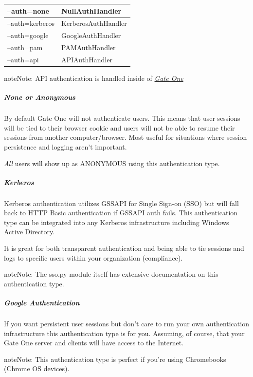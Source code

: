 \documentclass[letterpaper,10pt,openany]{sphinxmanual}
\begin{document}
\begin{tabulary}{\linewidth}{|L|L|}
\hline

--auth=none
 & 
NullAuthHandler
\\
\hline
--auth=kerberos
 & 
KerberosAuthHandler
\\
\hline
--auth=google
 & 
GoogleAuthHandler
\\
\hline
--auth=pam
 & 
PAMAuthHandler
\\
\hline
--auth=api
 & 
APIAuthHandler
\\
\hline\end{tabulary}


\begin{notice}{note}{Note:}
API authentication is handled inside of {\hyperref[Developer/server:gateone-py]{\emph{Gate One}}}
\end{notice}


\subparagraph{None or Anonymous}
\label{Developer/authentication:none-or-anonymous}
By default Gate One will not authenticate users.  This means that user sessions
will be tied to their browser cookie and users will not be able to resume their
sessions from another computer/browser.  Most useful for situations where
session persistence and logging aren't important.

\emph{All} users will show up as ANONYMOUS using this authentication type.


\subparagraph{Kerberos}
\label{Developer/authentication:kerberos}
Kerberos authentication utilizes GSSAPI for Single Sign-on (SSO) but will fall
back to HTTP Basic authentication if GSSAPI auth fails.  This authentication
type can be integrated into any Kerberos infrastructure including Windows
Active Directory.

It is great for both transparent authentication and being able to tie sessions
and logs to specific users within your organization (compliance).

\begin{notice}{note}{Note:}
The sso.py module itself has extensive documentation on this authentication
type.
\end{notice}


\subparagraph{Google Authentication}
\label{Developer/authentication:google-authentication}
If you want persistent user sessions but don't care to run your own
authentication infrastructure this authentication type is for you.  Assuming,
of course, that your Gate One server and clients will have access to the
Internet.

\begin{notice}{note}{Note:}
This authentication type is perfect if you're using Chromebooks (Chrome OS
devices).
\end{notice}
\end{document}
